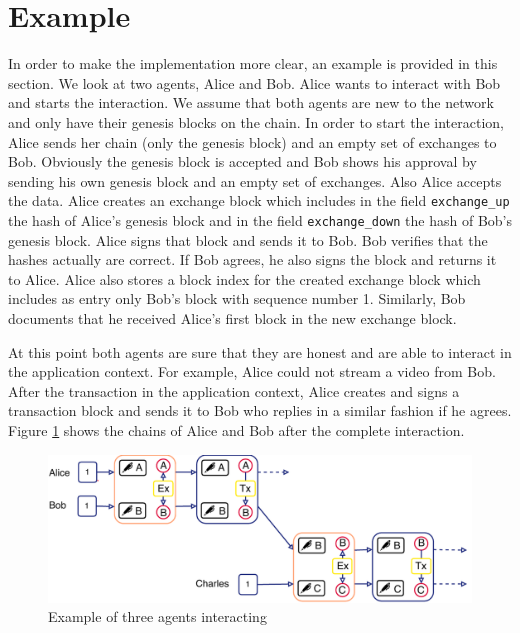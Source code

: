\section{Example}
In order to make the implementation more clear, an example is provided in this section. We look at two
agents, Alice and Bob. Alice wants to interact with Bob and starts the interaction. We assume that
both agents are new to the network and only have their genesis blocks on the chain. In order to
start the interaction, Alice sends her chain (only the genesis block) and an empty set of exchanges
to Bob. Obviously the genesis block is accepted and Bob shows his approval by sending his own
genesis block and an empty set of exchanges. Also Alice accepts the data. Alice creates an exchange
block which includes in the field \verb|exchange_up| the hash of Alice's genesis block and in the field 
\verb|exchange_down| the hash of Bob's genesis block. Alice signs that block and sends it to Bob. 
Bob verifies that the hashes actually are correct. If Bob agrees, he also signs the block and returns 
it to Alice. Alice also stores a block index for the created exchange block which includes as entry 
only Bob's block with sequence number 1. Similarly, Bob documents that he received Alice's first block
in the new exchange block.

At this point both agents are sure that they are honest and are able to interact in the 
application context. For example, Alice could not stream a video from Bob. After the transaction in 
the application context, Alice creates and signs a transaction block and sends it to Bob who replies 
in a similar fashion if he agrees. Figure \ref{fig:exchange_example} shows the chains of Alice and 
Bob after the complete interaction. 

\begin{figure}
    \centering
    \includegraphics[width=\textwidth]{images/trustchain_example.pdf}
    \caption{Example of three agents interacting}
    \label{fig:exchange_example}
\end{figure}

